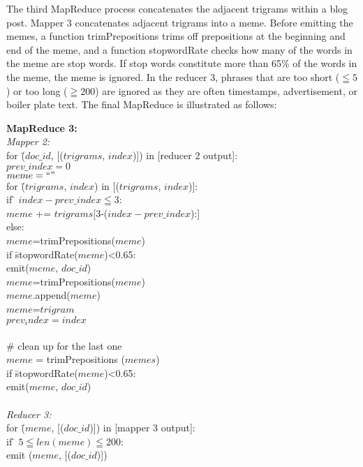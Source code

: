 \documentclass{sig-alternate}
\begin{document}
The third MapReduce process concatenates the adjacent trigrams within a blog post. Mapper 3 concatenates adjacent trigrams into a meme. Before emitting the memes, a function trimPrepositions trims off prepositions at the beginning and end of the meme, and a function stopwordRate checks how many of the words in the meme are stop words. If stop words constitute more than 65\% of the words in the meme, the meme is ignored. In the reducer 3, phrases that are too short ($\leqq 5$) or too long ($\geqq 200$) are ignored as they are often timestamps, advertisement, or boiler plate text. The final MapReduce is illustrated as follows:

\begin{centering}
\begin{tabbing}
\textbf{MapReduce 3:}\\
\emph{Mapper 2:}\\

for \= ($doc\_id$, [($trigrams$, $index$)]) in [reducer 2 output]:\\
\>	$prev\_index=0$\\
\>	$meme=``"$\\
\>	for \= ($trigrams$, $index$) in [($trigrams$, $index$)]:\\
\>\>	if \= $index-prev\_index \leqq 3$:\\
\>\>\>		$meme$ += $trigrams$[3-($index-prev\_index$):]\\
\>\>	else:\\
\>\>\>		$meme$=trimPrepositions($meme$)\\
\>\>\>		if \= stopwordRate($meme$)<0.65:\\
\>\>\>\>		emit($meme$, $doc\_id$)\\
\>\>\>		$meme$=trimPrepositions($meme$)\\
\>\>\>		$meme$.append($meme$)\\
\>\>\>		$meme$=$trigram$\\
\>\>	$prev_index=index$\\
\\	
\>	\# clean up for the last one\\
\>		$meme$ = trimPrepositions ($memes$)\\
\>		if \= stopwordRate($meme$)<0.65:\\
\>\>		emit($meme$, $doc\_id$)\\
\\
\emph{Reducer 3:}\\
for \= ($meme$, [($doc\_id$)]) in [mapper 3 output]:\\
\> if \= $5 \leqq len(meme) \leqq 200$:\\
\>\>	emit ($meme$, [($doc\_id$)])

\end{tabbing}

\end{centering}
\end{document}
